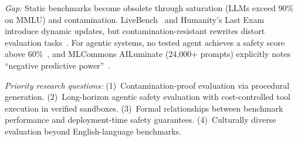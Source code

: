 \emph{Gap:} Static benchmarks become obsolete through saturation (LLMs exceed 90\% on MMLU) and contamination. LiveBench~\cite{white2024livebench} and Humanity's Last Exam~\cite{phan2025humanitylastexam} introduce dynamic updates, but contamination-resistant rewrites distort evaluation tasks~\cite{sun2025contamination}. For agentic systems, no tested agent achieves a safety score above 60\%~\cite{zhang2024agentsafetybench}, and MLCommons AILuminate (24,000+ prompts) explicitly notes ``negative predictive power''~\cite{ghosh2024ailuminate}.

\emph{Priority research questions:} (1)~Contamination-proof evaluation via procedural generation. (2)~Long-horizon agentic safety evaluation with cost-controlled tool execution in verified sandboxes. (3)~Formal relationships between benchmark performance and deployment-time safety guarantees. (4)~Culturally diverse evaluation beyond English-language benchmarks.
